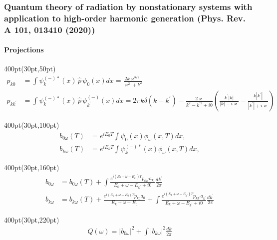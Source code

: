 \begin{frame}
\frametitle{Quantum theory of radiation by nonstationary systems 
	with application to high-order harmonic generation
        (Phys. Rev. A 101, 013410 (2020))}
	\framesubtitle{Projections}




\begin{textblock*}{400pt}(30pt,50pt)
\footnotesize
\begin{align}
p_{k0} & = \int \psi_k^{(-)*}(x)\,\hat{p}\, \psi_0(x) dx 
       =  \frac{2k\varkappa^{3/2}}{\varkappa^2 + k^2} \\
p_{kk^\prime} & = \int \psi_k^{(-)*}(x)\,\hat{p}\,\psi_{k^\prime}^{(-)}(x) dx
       = 2\pi k \delta(k-k^\prime)
 - \frac{2\varkappa}{k^2 - k^{\prime2} + i0}
 \left( \frac{k^\prime|k|}{|k|-i\varkappa} 
       - \frac{k|k^\prime|}{|k^\prime|+i\varkappa}\right) 
\end{align}
\end{textblock*}


\begin{textblock*}{400pt}(30pt,100pt)
\footnotesize
\begin{align}
b_{0\omega}(T) & = e^{iE_0T} \int \psi_0(x) \phi_\omega(x,T) dx,      \\
b_{k\omega}(T) & = e^{iE_kT} \int \psi_k^{(-)*}(x) \phi_\omega(x,T) dx, 
\end{align}
\end{textblock*}



\begin{textblock*}{400pt}(30pt,160pt)
\footnotesize
\begin{align}
b_{0\omega} & = b_{0\omega}(T)
 +\int\frac{e^{i(E_0+\omega-E_{k^\prime})T}p_{0k^\prime}a_{k^\prime}}
{E_0+\omega-E_{k^\prime} + i0} \frac{dk^\prime}{2\pi} \\
b_{k\omega} & = b_{k\omega}(T)
 +\frac{e^{i(E_k+\omega-E_0)T}p_{k0}a_0}{E_k+\omega-E_0}
 +\int\frac{e^{i(E_k+\omega-E_{k^\prime})T}p_{kk^\prime}a_{k^\prime}}
{E_k+\omega-E_{k^\prime} + i0} \frac{dk^\prime}{2\pi} 
\end{align}
\end{textblock*}


\begin{textblock*}{400pt}(30pt,220pt)
\footnotesize
\begin{align}
  Q(\omega) = \left| b_{0\omega}\right|^2 
        + \int \left| b_{k\omega}\right|^2 \frac{dk}{2\pi} 
\end{align}
\end{textblock*}

\end{frame}




